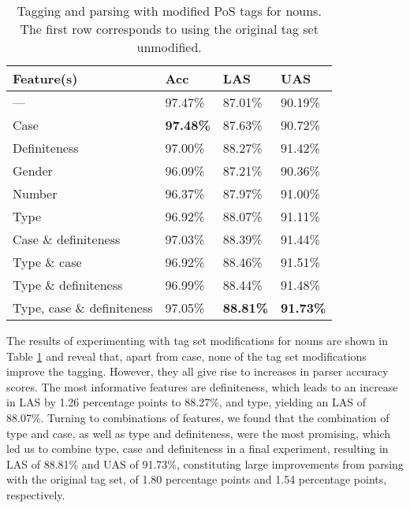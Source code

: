 \documentclass[11pt,a4paper]{article}
\begin{document}
\begin{table}
    \centering
    \smaller[1]
    \begin{tabular}{@{}llll@{}}
        \toprule
        \textbf{Feature(s)} & \textbf{Acc} & \textbf{LAS} & \textbf{UAS}
        \\
        \midrule
        --- & 97.47\% & 87.01\% & 90.19\% \\
        Case & \textbf{97.48\%} & 87.63\% & 90.72\% \\
        Definiteness & 97.00\% & 88.27\% & 91.42\% \\
        Gender & 96.09\% & 87.21\% & 90.36\% \\
        Number & 96.37\% & 87.97\% & 91.00\% \\
        Type & 96.92\% & 88.07\% & 91.11\% \\
        Case \& definiteness & 97.03\% & 88.39\% & 91.44\% \\
        Type \& case & 96.92\% & 88.46\% & 91.51\% \\
        Type \& definiteness & 96.99\% & 88.44\% & 91.48\% \\
        Type, case \& definiteness & 97.05\% & \textbf{88.81\%} &
        \textbf{91.73\%} \\
        \bottomrule
    \end{tabular}
    \caption{Tagging and parsing with modified PoS tags for nouns. The first
      row corresponds to using the original tag set unmodified.}
    \label{substresults}
\end{table}

The results of experimenting with tag set modifications
for nouns are shown in Table \ref{substresults} and reveal that, apart from
case, none of the tag set modifications improve the tagging. However, they all
give rise to increases in parser accuracy scores.
The most informative features are definiteness, which
leads to an increase in LAS by 1.26 percentage points to 88.27\%, and type,
yielding an LAS of 88.07\%. Turning to combinations of features, we found that
the combination of type and case, as well as type and definiteness, were the
most promising, which led us to combine type, case and definiteness in a final
experiment, resulting in LAS of 88.81\% and UAS of 91.73\%, constituting large
improvements from parsing with the original tag set, of 1.80 percentage points
and 1.54 percentage points, respectively.
\end{document}
